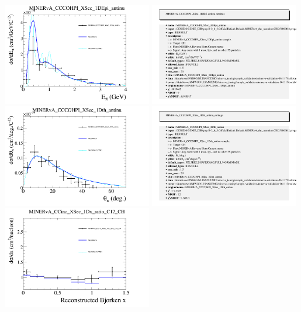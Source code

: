 \documentclass{article}
\begin{document}
\centering
\includegraphics[width=0.49\textwidth]{figures/nuisance_MINERvA_CCCOHPI_XSec_1DEpi_antinu_comp.png}
\includegraphics[width=0.49\textwidth]{figures/nuisance_MINERvA_CCCOHPI_XSec_1DEpi_antinu_info.png}
\centering
\includegraphics[width=0.49\textwidth]{figures/nuisance_MINERvA_CCCOHPI_XSec_1Dth_antinu_comp.png}
\includegraphics[width=0.49\textwidth]{figures/nuisance_MINERvA_CCCOHPI_XSec_1Dth_antinu_info.png}
\centering
\includegraphics[width=0.49\textwidth]{figures/nuisance_MINERvA_CCinc_XSec_1Dx_ratio_C12_CH_comp.png}
\end{document}
